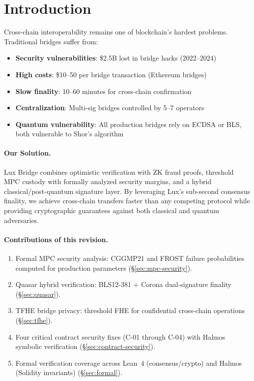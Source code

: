 \section{Introduction}


Cross-chain interoperability remains one of blockchain's hardest problems. Traditional bridges suffer from:
\begin{itemize}[leftmargin=1.1em]
  \item \textbf{Security vulnerabilities}: \$2.5B lost in bridge hacks (2022--2024)
  \item \textbf{High costs}: \$10--50 per bridge transaction (Ethereum bridges)
  \item \textbf{Slow finality}: 10--60 minutes for cross-chain confirmation
  \item \textbf{Centralization}: Multi-sig bridges controlled by 5--7 operators
  \item \textbf{Quantum vulnerability}: All production bridges rely on ECDSA or BLS, both vulnerable to Shor's algorithm
\end{itemize}

\paragraph{Our Solution.} Lux Bridge combines optimistic verification with ZK fraud proofs, threshold MPC custody with formally analyzed security margins, and a hybrid classical/post-quantum signature layer. By leveraging Lux's sub-second consensus finality, we achieve cross-chain transfers faster than any competing protocol while providing cryptographic guarantees against both classical and quantum adversaries.

\paragraph{Contributions of this revision.}
\begin{enumerate}[leftmargin=1.1em]
  \item Formal MPC security analysis: CGGMP21 and FROST failure probabilities computed for production parameters (\S\ref{sec:mpc-security}).
  \item Quasar hybrid verification: BLS12-381 + Corona dual-signature finality (\S\ref{sec:quasar}).
  \item TFHE bridge privacy: threshold FHE for confidential cross-chain operations (\S\ref{sec:tfhe}).
  \item Four critical contract security fixes (C-01 through C-04) with Halmos symbolic verification (\S\ref{sec:contract-security}).
  \item Formal verification coverage across Lean~4 (consensus/crypto) and Halmos (Solidity invariants) (\S\ref{sec:formal}).
\end{enumerate}

